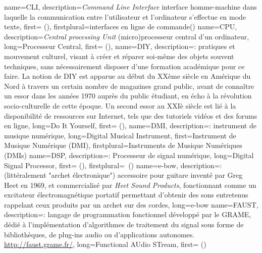 {
    name={CLI},
    description={\textit{Command Line Interface} interface homme-machine dans laquelle la communication entre l'utilisateur et l'ordinateur s'effectue en mode texte},
    first={} (),
    firstplural={interfaces en ligne de commande(\glspluralsuffix)}
}
{
    name={CPU},
    description={\textit{Central processing Unit} (micro)processeur central d'un ordinateur},
    long={Processeur Central},
    first={} (),
}
{
    name={DIY},
    description={\textit{}: pratiques et mouvement culturel, visant à créer et réparer soi-même des objets souvent techniques, sans nécessairement disposer d'une formation académique pour ce faire. La notion de DIY est apparue au début du XXème siècle en Amérique du Nord à travers un certain nombre de magazines grand public, avant de connaître un essor dans les années 1970 auprès du public étudiant, en écho à la révolution socio-culturelle de cette époque. Un second essor au XXIè siècle est lié à la disponibilité de ressources sur Internet, tels que des tutoriels vidéos et des forums en ligne},
    long={Do It Yourself},
    first={} (),
}
{
    name={DMI},
    description={\textit{}: instrument de musique numérique},
    long={Digital Musical Instrument},
    first={Instrument de Musique Numérique (DMI)},
    firstplural={Instruments de Musique Numériques (DMIs)}
}
{
    name={DSP},
    description={\textit{}: Processeur de signal numérique},
    long={Digital Signal Processor},
    first={} (),
    firstplural={\glspluralsuffix\ (\glspluralsuffix)}
}
{
    name={e-bow},
    description={\textit{}:(littéralement "archet électronique") accessoire pour guitare inventé par Greg Heet en 1969, et commercialisé par \textit{Heet Sound Products}, fonctionnant comme un excitateur électromagnétique portatif permettant d'obtenir des sons entretenus rappelant ceux produits par un archet sur des cordes},
    long={e-bow}
}
{
    name={FAUST},
    description={\textit{}: langage de programmation fonctionnel développé par le \gls{GRAME}, dédié à l'implémentation d'algorithmes de traitement du signal sous forme de bibliothèques, de plug-ins audio ou d'applications autonomes. \url{http://faust.grame.fr/}},
    long={Functional AUdio STream},
    first={} ()
}
